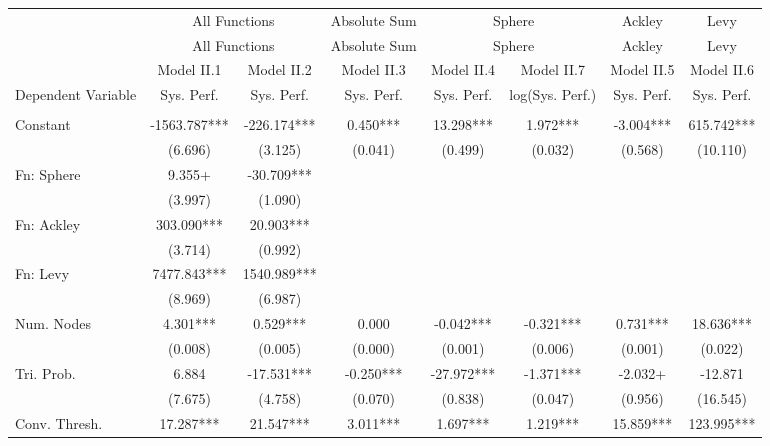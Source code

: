 \begin{table}
\centering
\begin{tabular}[t]{lccccccc}
\toprule
\multicolumn{1}{c}{ } & \multicolumn{2}{c}{All Functions} & \multicolumn{1}{c}{Absolute Sum} & \multicolumn{2}{c}{Sphere} & \multicolumn{1}{c}{Ackley} & \multicolumn{1}{c}{Levy} \\
\cmidrule(l{3pt}r{3pt}){2-3} \cmidrule(l{3pt}r{3pt}){4-4} \cmidrule(l{3pt}r{3pt}){5-6} \cmidrule(l{3pt}r{3pt}){7-7} \cmidrule(l{3pt}r{3pt}){8-8}
\multicolumn{1}{c}{ } & \multicolumn{2}{c}{All Functions} & \multicolumn{1}{c}{Absolute Sum} & \multicolumn{2}{c}{Sphere} & \multicolumn{1}{c}{Ackley} & \multicolumn{1}{c}{Levy} \\
\cmidrule(l{3pt}r{3pt}){2-3} \cmidrule(l{3pt}r{3pt}){4-4} \cmidrule(l{3pt}r{3pt}){5-6} \cmidrule(l{3pt}r{3pt}){7-7} \cmidrule(l{3pt}r{3pt}){8-8}
  & Model II.1 & Model II.2 & Model II.3 & Model II.4 & Model II.7 & Model II.5 & Model II.6\\
\midrule
Dependent Variable & Sys. Perf. & Sys. Perf. & Sys. Perf. & Sys. Perf. & log(Sys. Perf.) & Sys. Perf. & Sys. Perf.\\
 &  &  &  &  &  &  & \\
Constant & -1563.787*** & -226.174*** & 0.450*** & 13.298*** & 1.972*** & -3.004*** & 615.742***\\
 & (6.696) & (3.125) & (0.041) & (0.499) & (0.032) & (0.568) & (10.110)\\
Fn: Sphere & 9.355+ & -30.709*** &  &  &  &  & \\
 & (3.997) & (1.090) &  &  &  &  & \\
Fn: Ackley & 303.090*** & 20.903*** &  &  &  &  & \\
 & (3.714) & (0.992) &  &  &  &  & \\
Fn: Levy & 7477.843*** & 1540.989*** &  &  &  &  & \\
 & (8.969) & (6.987) &  &  &  &  & \\
Num. Nodes & 4.301*** & 0.529*** & 0.000 & -0.042*** & -0.321*** & 0.731*** & 18.636***\\
 & (0.008) & (0.005) & (0.000) & (0.001) & (0.006) & (0.001) & (0.022)\\
Tri. Prob. & 6.884 & -17.531*** & -0.250*** & -27.972*** & -1.371*** & -2.032+ & -12.871\\
 & (7.675) & (4.758) & (0.070) & (0.838) & (0.047) & (0.956) & (16.545)\\
Conv. Thresh. & 17.287*** & 21.547*** & 3.011*** & 1.697*** & 1.219*** & 15.859*** & 123.995***\\

\end{tabular}
\end{table}
